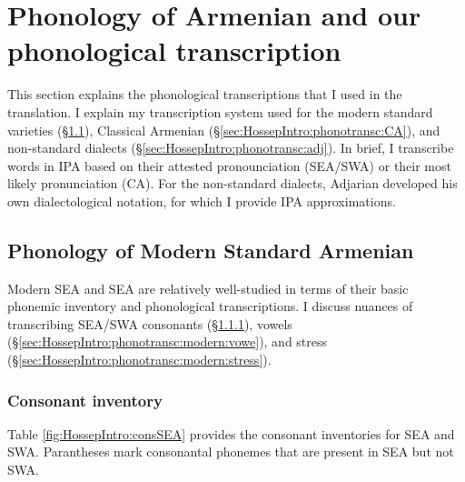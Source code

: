  \section{Phonology of Armenian and our phonological transcription}\label{sec:HossepIntro:phonotransc}

This section explains the phonological transcriptions that I used in the translation. I explain my transcription system used for the modern standard varieties (\S\ref{sec:HossepIntro:phonotransc:modern}), Classical Armenian (\S\ref{sec:HossepIntro:phonotransc:CA}),  and non-standard dialects (\S\ref{sec:HossepIntro:phonotransc:adj}). In brief, I transcribe words in IPA based on their attested pronounciation (SEA/SWA)  or their most likely pronunciation (CA). For the non-standard dialects, Adjarian developed his own dialectological notation, for which I provide IPA approximations. 
\subsection{Phonology of Modern Standard Armenian}\label{sec:HossepIntro:phonotransc:modern}

Modern SEA and SEA are relatively well-studied in terms of their basic phonemic inventory and phonological transcriptions. I discuss nuances of transcribing SEA/SWA consonants (\S\ref{sec:HossepIntro:phonotransc:modern:cons}), vowels (\S\ref{sec:HossepIntro:phonotransc:modern:vowe}),  and stress (\S\ref{sec:HossepIntro:phonotransc:modern:stress}). 
\subsubsection{Consonant inventory}\label{sec:HossepIntro:phonotransc:modern:cons}
Table \ref{fig:HossepIntro:consSEA} provides the consonant inventories for SEA and SWA. Parantheses mark consonantal phonemes that are present in SEA but not SWA. 

\begin{table}[H]
	\caption{Consonant inventory of SEA and SWA}\label{fig:HossepIntro:consSEA}
\end{table}

